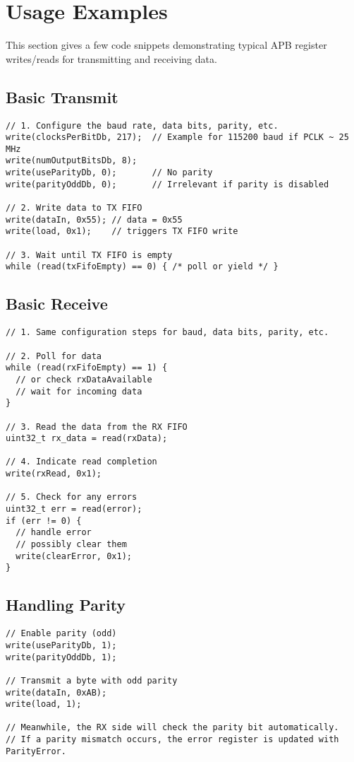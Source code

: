 \section{Usage Examples}

This section gives a few code snippets demonstrating typical APB register writes/reads for transmitting and receiving data.

\subsection{Basic Transmit}

\begin{verbatim}
// 1. Configure the baud rate, data bits, parity, etc.
write(clocksPerBitDb, 217);  // Example for 115200 baud if PCLK ~ 25 MHz
write(numOutputBitsDb, 8);
write(useParityDb, 0);       // No parity
write(parityOddDb, 0);       // Irrelevant if parity is disabled

// 2. Write data to TX FIFO
write(dataIn, 0x55); // data = 0x55
write(load, 0x1);    // triggers TX FIFO write

// 3. Wait until TX FIFO is empty
while (read(txFifoEmpty) == 0) { /* poll or yield */ }
\end{verbatim}

\subsection{Basic Receive}

\begin{verbatim}
// 1. Same configuration steps for baud, data bits, parity, etc.

// 2. Poll for data
while (read(rxFifoEmpty) == 1) {
  // or check rxDataAvailable
  // wait for incoming data
}

// 3. Read the data from the RX FIFO
uint32_t rx_data = read(rxData);

// 4. Indicate read completion
write(rxRead, 0x1);

// 5. Check for any errors
uint32_t err = read(error);
if (err != 0) {
  // handle error
  // possibly clear them
  write(clearError, 0x1);
}
\end{verbatim}

\subsection{Handling Parity}

\begin{verbatim}
// Enable parity (odd)
write(useParityDb, 1);
write(parityOddDb, 1);

// Transmit a byte with odd parity
write(dataIn, 0xAB);
write(load, 1);

// Meanwhile, the RX side will check the parity bit automatically.
// If a parity mismatch occurs, the error register is updated with ParityError.
\end{verbatim}

